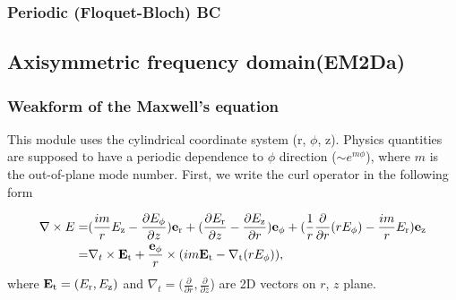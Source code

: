 \documentclass[11pt,a4paper,final]{report}
\begin{document}
 \subsubsection{Periodic (Floquet-Bloch) BC}
 
 
\subsection{Axisymmetric frequency domain(EM2Da)}
\subsubsection{Weakform of the Maxwell's equation}
This module uses the cylindrical coordinate system (r,  $\phi$, z). Physics quantities are supposed to have a periodic dependence to 
$\phi$ direction ($\sim e^{m \phi}$), where $m$ is the out-of-plane mode number. First, we write the curl operator in the following form

 \begin{align}
 \nabla \times E = &(\frac{im}{r} E_{\rm z} - \frac{\partial E_{\phi}}{\partial z})\mathbf{e}_{\rm r} +
( \frac{\partial E_{\rm r}}{\partial z} - \frac{\partial E_{\rm z}}{\partial r})\mathbf{e}_{\rm \phi}+
 (\frac{1}{r}\frac{\partial }{\partial r}(r E_{\phi}) - \frac{im}{r} E_{\rm r} )\mathbf{e}_{\rm z} 
 \notag \\ 
 = &\nabla_{t} \times \mathbf{E}_{\rm t} + \frac{\mathbf{e}_{\rm \phi}}{r} \times (im \mathbf{E}_{\rm t} - \nabla_{\rm t} (rE_{\rm \phi}) ),
 \end{align}
 where $\mathbf{E}_{\rm t} = (E_{\rm r}, E_{\rm z})$ and  $\nabla_{t} = (\frac{\partial }{\partial r}, \frac{\partial }{\partial z}$) are 2D vectors on $r$, $z$ plane.
 
\end{document}
